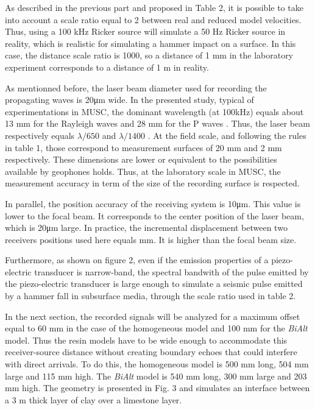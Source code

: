 \documentclass[extra,mreferee]{gji}
\newcommand{\bialt}{\textit{BiAlt} }
\begin{document}
As described in the previous part and proposed in Table 2, it is possible to take into account a scale ratio equal to 2 between real and reduced model velocities. Thus, using a 100 kHz Ricker source will simulate a 50 Hz Ricker source in reality, which is realistic for simulating a hammer impact on a surface. In this case, the distance scale ratio is 1000, so a distance of 1 mm in the laboratory experiment corresponds to a distance of 1 m in reality. 

{\color{magenta} As mentionned before, the laser beam diameter used for recording the propagating waves is 20μm wide. In the presented study, typical of experimentations in MUSC, the dominant wavelength (at 100kHz) equals about 13 mm for the Rayleigh waves and 28 mm for the P waves . Thus, the laser beam respectively equals  $\lambda /650 $ and $ \lambda /1400 $  . At the field scale, and following the rules in table 1, those correspond to measurement surfaces of 20 mm and 2 mm respectively. These dimensions are lower or equivalent to the possibilities available by geophones holds. Thus, at the laboratory scale in MUSC, the measurement accuracy in term of the size of the recording surface is respected.

In parallel, the position accuracy of the receiving system is 10μm. This value is lower to the focal beam. It corresponds to the center position of the laser beam, which is 20μm large. In practice, the incremental displacement between two receivers positions used here equals mm. It is higher than the focal beam size.

Furthermore, as shown on figure 2, even if the emission properties of a piezo-electric transducer is narrow-band, the spectral bandwith of the pulse emitted by the piezo-electric transducer is large enough to simulate a seismic pulse emitted by a hammer fall in subsurface media, through the scale ratio used in table 2.}

In the next section, the recorded signals will be analyzed for a maximum offset equal to 60 mm in the case of the homogeneous model and 100 mm for the \bialt model. Thus the resin models have to be wide enough to accommodate this receiver-source distance without creating boundary echoes that could interfere with direct arrivals. To do this, the homogeneous model is 500 mm long, 504 mm large and 115 mm high. The \bialt model is 540 mm long, 300 mm large and 203 mm high. The geometry is presented in Fig. 3 and simulates an interface between a 3 m thick layer of clay over a limestone layer.
\end{document}

